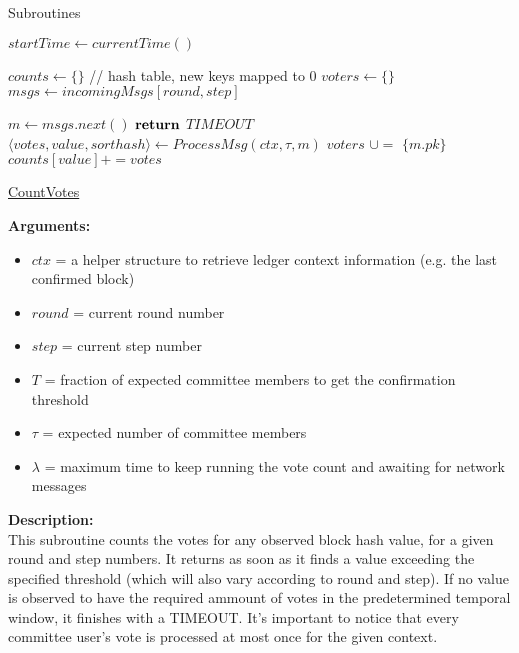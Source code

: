 \documentclass[10pt,a4paper]{article}
\begin{document}
\begin{section}{Subroutines}

\begin{algorithm}[H]
    \begin{algorithmic}[H]

    \State $startTime \gets currentTime()$

    \State $counts \gets \{\}$ // hash table, new keys mapped to 0
    \State $voters \gets \{\}$
    \State $msgs \gets incomingMsgs[round,step]$

        \State $m \gets msgs.next()$
                \State $\Return$ $TIMEOUT$
            \EndIf
        \Else
            \State $ \langle votes, value, sorthash \rangle \gets ProcessMsg(ctx, \tau, m)$
            \State $voters$ $\cup=$ $\{m.pk\}$
            \State $counts[value] += votes$
        \EndIf
    \EndWhile
    \EndFunction
    \end{algorithmic}
    \caption{\underline{CountVotes}}
\end{algorithm}

\noindent \textbf{Arguments:}
\begin{itemize}
    \item $ctx$ = a helper structure to retrieve ledger context information (e.g. the last confirmed block)
    \item $round$ = current round number
    \item $step$ = current step number
    \item $T$ = fraction of expected committee members to get the confirmation threshold
    \item $\tau$ = expected number of committee members
    \item $\lambda$ = maximum time to keep running the vote count and awaiting for network messages
  \end{itemize}

\noindent \textbf{Description:}\\
This subroutine counts the votes for any observed block hash value, for a given round and step numbers.
It returns as soon as it finds a value exceeding the specified threshold (which will also vary according to round and step).
If no value is observed to have the required ammount of votes in the predetermined temporal window, it finishes with a TIMEOUT.
It's important to notice that every committee user's vote is processed at most once for the given context.\\


\end{section}
\end{document}
